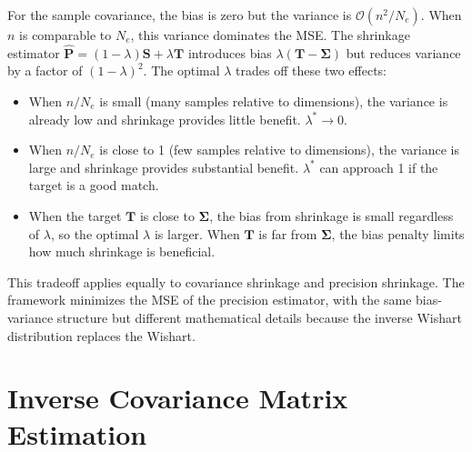 For the sample covariance, the bias is zero but the variance is $\mathcal{O}(n^2/N_e)$. When $n$ is comparable to $N_e$, this variance dominates the MSE. The shrinkage estimator $\hat{\mathbf{P}} = (1 - \lambda)\mathbf{S} + \lambda\mathbf{T}$ introduces bias $\lambda(\mathbf{T} - \boldsymbol{\Sigma})$ but reduces variance by a factor of $(1 - \lambda)^2$. The optimal $\lambda$ trades off these two effects:
\begin{itemize}
\item When $n/N_e$ is small (many samples relative to dimensions), the variance is already low and shrinkage provides little benefit. $\lambda^* \to 0$.
\item When $n/N_e$ is close to 1 (few samples relative to dimensions), the variance is large and shrinkage provides substantial benefit. $\lambda^*$ can approach 1 if the target is a good match.
\item When the target $\mathbf{T}$ is close to $\boldsymbol{\Sigma}$, the bias from shrinkage is small regardless of $\lambda$, so the optimal $\lambda$ is larger. When $\mathbf{T}$ is far from $\boldsymbol{\Sigma}$, the bias penalty limits how much shrinkage is beneficial.
\end{itemize}

This tradeoff applies equally to covariance shrinkage and precision shrinkage. The \citep{bodnar2016direct} framework minimizes the MSE of the precision estimator, with the same bias-variance structure but different mathematical details because the inverse Wishart distribution replaces the Wishart.

\section{Inverse Covariance Matrix Estimation}
\label{sec:precision_estimation}

